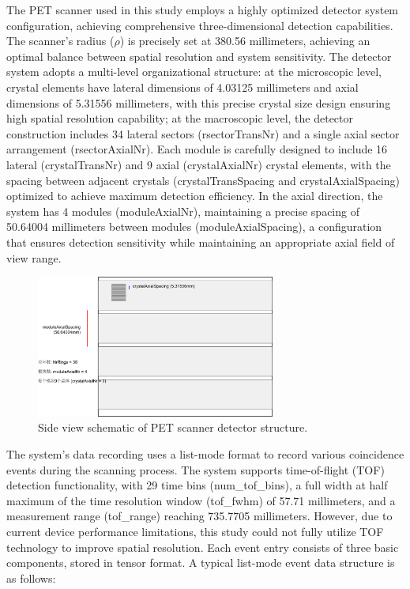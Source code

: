 \documentclass[
reprint,
superscriptaddress,
nofootinbib,
amsmath,amssymb,
aps,
prd,
]{revtex4-2}
\begin{document}
The PET scanner used in this study employs a highly optimized detector system configuration, achieving comprehensive three-dimensional detection capabilities. The scanner's radius ($\rho$) is precisely set at 380.56 millimeters, achieving an optimal balance between spatial resolution and system sensitivity. The detector system adopts a multi-level organizational structure: at the microscopic level, crystal elements have lateral dimensions of 4.03125 millimeters and axial dimensions of 5.31556 millimeters, with this precise crystal size design ensuring high spatial resolution capability; at the macroscopic level, the detector construction includes 34 lateral sectors (rsectorTransNr) and a single axial sector arrangement (rsectorAxialNr). Each module is carefully designed to include 16 lateral (crystalTransNr) and 9 axial (crystalAxialNr) crystal elements, with the spacing between adjacent crystals (crystalTransSpacing and crystalAxialSpacing) optimized to achieve maximum detection efficiency. In the axial direction, the system has 4 modules (moduleAxialNr), maintaining a precise spacing of 50.64004 millimeters between modules (moduleAxialSpacing), a configuration that ensures detection sensitivity while maintaining an appropriate axial field of view range.
\begin{figure}[htbp]
    \centering
    \vspace{-0.2cm}
    \includegraphics[width=0.7\textwidth]{Images/pet-side-view}
    \vspace{-0.2cm}
    \caption{Side view schematic of PET scanner detector structure.}
    \vspace{-0.2cm}
    \label{fig:pet_structures_side}
\end{figure}
The system's data recording uses a list-mode format to record various coincidence events during the scanning process. The system supports time-of-flight (TOF) detection functionality, with 29 time bins (num\_tof\_bins), a full width at half maximum of the time resolution window (tof\_fwhm) of 57.71 millimeters, and a measurement range (tof\_range) reaching 735.7705 millimeters. However, due to current device performance limitations, this study could not fully utilize TOF technology to improve spatial resolution. Each event entry consists of three basic components, stored in tensor format. A typical list-mode event data structure is as follows:
\end{document}
